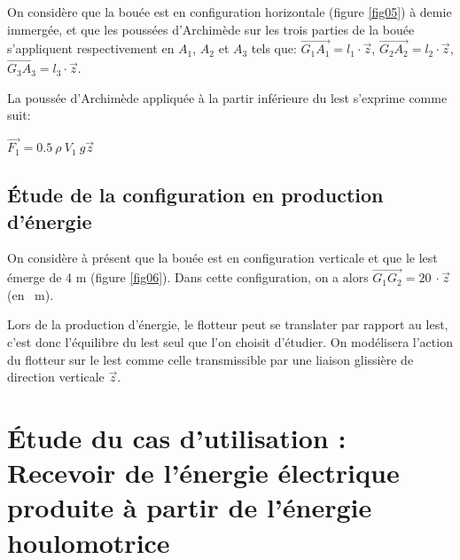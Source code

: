On considère que la bouée est en configuration horizontale (figure \ref{fig05}) à demie immergée, et que les poussées d'Archimède sur les trois parties de la bouée s'appliquent respectivement en $A_1$, $A_2$ et $A_3$ tels que: $\overrightarrow{G_1A_1}=l_1\cdot\vec{z}$,
$\overrightarrow{G_2A_2}=l_2\cdot\vec{z}$,
$\overrightarrow{G_3A_3}=l_3\cdot\vec{z}$.

La poussée d'Archimède appliquée à la partir inférieure du lest s'exprime comme suit:
\begin{center}
$\overrightarrow{F_1}=0.5~\rho~V_1~g\overrightarrow{z}$
\end{center}





\subsection{Étude de la configuration en production d'énergie}

On considère à présent que la bouée est en configuration verticale et que le lest émerge de 4 m (figure \ref{fig06}). Dans cette configuration, on a alors $\overrightarrow{G_1G_2}=\SI{20}{}\cdot\vec{z}$ (en \SI{}{\m}).

Lors de la production d'énergie, le flotteur peut se translater par rapport au lest, c'est donc l'équilibre du lest seul que l'on choisit d'étudier. On modélisera l'action du flotteur sur le lest comme celle transmissible par une liaison glissière de direction verticale $\vec{z}$.



\section{Étude du cas d'utilisation : \og Recevoir de l'énergie électrique produite à partir de l'énergie houlomotrice \fg}


